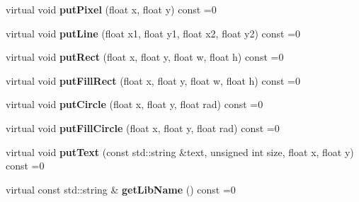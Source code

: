 \begin{DoxyCompactItemize}
\item 
\mbox{\label{classArcade_1_1Display_1_1IDisplayModule_a86a61eaa1d0cf2ddfdedbaa04054da90}} 
virtual void {\bfseries put\+Pixel} (float x, float y) const =0
\item 
\mbox{\label{classArcade_1_1Display_1_1IDisplayModule_a669da8dd0fc5360d11c735d68c17bc6e}} 
virtual void {\bfseries put\+Line} (float x1, float y1, float x2, float y2) const =0
\item 
\mbox{\label{classArcade_1_1Display_1_1IDisplayModule_a4c4072d7444006b9a0ba134c684e58b5}} 
virtual void {\bfseries put\+Rect} (float x, float y, float w, float h) const =0
\item 
\mbox{\label{classArcade_1_1Display_1_1IDisplayModule_a1e9f08e3568ac005e92191eea6c0ae4d}} 
virtual void {\bfseries put\+Fill\+Rect} (float x, float y, float w, float h) const =0
\item 
\mbox{\label{classArcade_1_1Display_1_1IDisplayModule_a68b7b140a378dc416ec278d97dc76e9e}} 
virtual void {\bfseries put\+Circle} (float x, float y, float rad) const =0
\item 
\mbox{\label{classArcade_1_1Display_1_1IDisplayModule_aa3d23b9294132b6efb28dbc932892d1b}} 
virtual void {\bfseries put\+Fill\+Circle} (float x, float y, float rad) const =0
\item 
\mbox{\label{classArcade_1_1Display_1_1IDisplayModule_a9740f30e3135d3a51851bdca07ef88a3}} 
virtual void {\bfseries put\+Text} (const std\+::string \&text, unsigned int size, float x, float y) const =0
\item 
\mbox{\label{classArcade_1_1Display_1_1IDisplayModule_a0d8e957815e94766bdefbd7a5043e81a}} 
virtual const std\+::string \& {\bfseries get\+Lib\+Name} () const =0
\end{DoxyCompactItemize}
